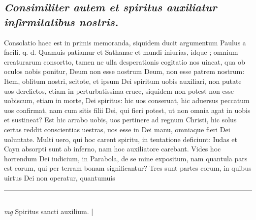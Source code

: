 \documentclass{article}
\begin{document}
\begin{pages}
\subsection*{\textit{Consimiliter autem et spiritus auxiliatur infirmitatibus nostris. }}\pstart Consolatio haec est in primis memoranda, siquidem ducit argumentum Paulus a facili. q. d. Quamuis patiamur et Sathanae et mundi iniurias, idque ; omnium creaturarum consortto, tamen ne ulla desperationis cogitatio nos uincat, qua ob oculos nobis ponitur, Deum non esse nostrum Deum, non esse patrem nostrum: Item, oblitum nostri, scitote, et ipsum Dei spiritum uobis auxiliari, non putate uos derelictos, etiam in perturbatissima cruce, siquidem non potest non esse uobiscum, etiam in morte, Dei spiritus: hic uos conseruat, hic aduersus peccatum uos confirmat, nam cum sitis filii Dei, qui fieri potest, ut non omnia agat in uobis et sustineat? Est hic arrabo uobis, uos pertinere ad regnum Christi, hic solus certas reddit conscientias uestras, uos esse in Dei manu, omniaque  fieri Dei uoluntate. Multi uero, qui hoc carent spiritu, in tentatione deficiunt: Iudas et Cayn absorpti sunt ab inferno, nam hoc auxiliatore carebant. Vides hoc horrendum Dei iudicium, in Parabola, de se mine expositum, nam quantula pars est eorum, qui per terram bonam significantur? Tres sunt partes corum, in quibus uirtus Dei non operatur, quantumuis  \pend
\vspace{0.5cm}\noindent
\vspace{0.2cm}\rule{1cm}{0.2pt}\\ 
\hspace{0.2cm}\textit{mg}
\footnotesize Spiritus sancti auxilium.  
\normalsize| 

\end{pages}
\end{document}
